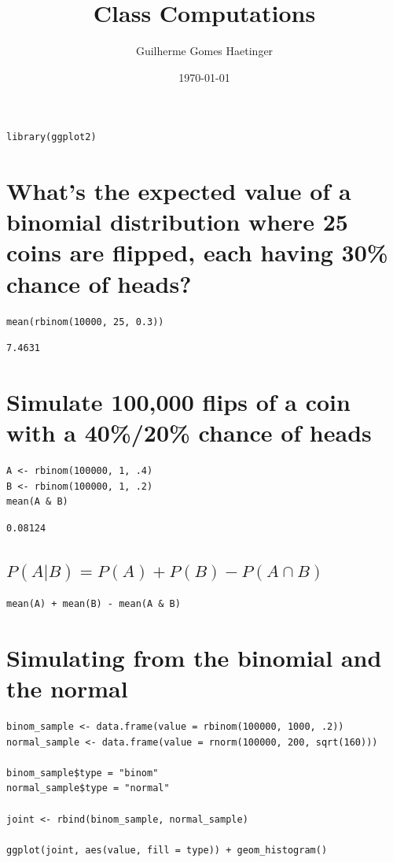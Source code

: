 \documentclass[11pt]{article}
\author{Guilherme Gomes Haetinger}
\date{\today}
\title{Class Computations}
\begin{document}
\maketitle
\tableofcontents

\begin{verbatim}
library(ggplot2)
\end{verbatim}


\section{What's the expected value of a binomial distribution where 25 coins are flipped, each having 30\% chance of heads?}
\label{sec:orgceb31bd}
\begin{verbatim}
mean(rbinom(10000, 25, 0.3))
\end{verbatim}

\begin{verbatim}
7.4631
\end{verbatim}

\section{Simulate 100,000 flips of a coin with a 40\%/20\% chance of heads}
\label{sec:org3fd55ac}
\begin{verbatim}
A <- rbinom(100000, 1, .4)
B <- rbinom(100000, 1, .2)
mean(A & B)
\end{verbatim}

\begin{verbatim}
0.08124
\end{verbatim}

\subsection{\(P(A|B) = P(A) + P(B) - P(A \cap B)\)}
\label{sec:orga129314}
\begin{verbatim}
mean(A) + mean(B) - mean(A & B)
\end{verbatim}

\section{Simulating from the binomial and the normal}
\label{sec:org1fe5802}
\begin{verbatim}
binom_sample <- data.frame(value = rbinom(100000, 1000, .2))
normal_sample <- data.frame(value = rnorm(100000, 200, sqrt(160)))

binom_sample$type = "binom"
normal_sample$type = "normal"

joint <- rbind(binom_sample, normal_sample)

ggplot(joint, aes(value, fill = type)) + geom_histogram()
\end{verbatim}
\end{document}

